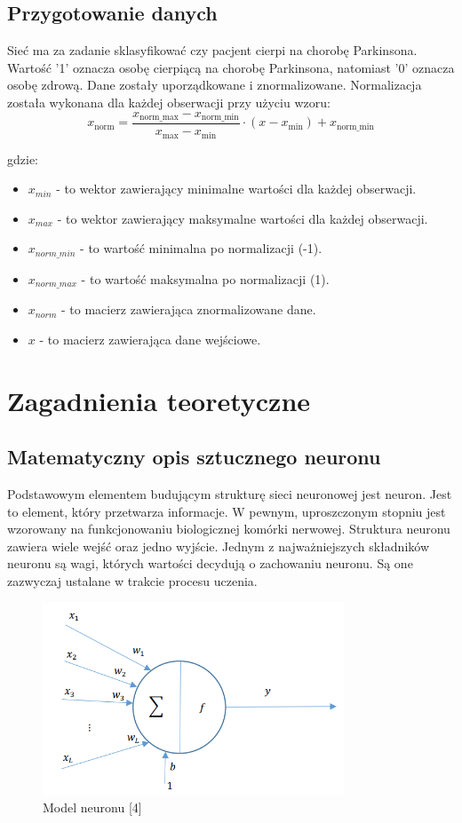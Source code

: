\documentclass{article}
\begin{document}
\subsection{Przygotowanie danych}
Sieć ma za zadanie sklasyfikować czy pacjent cierpi na chorobę Parkinsona. Wartość '1' oznacza osobę cierpiącą na chorobę Parkinsona, natomiast '0' oznacza osobę zdrową.
Dane zostały uporządkowane i znormalizowane.
Normalizacja została wykonana dla każdej obserwacji przy użyciu wzoru:
\[
    x_{\text{norm}} = \frac{{x_{\text{norm\_max}} - x_{\text{norm\_min}}}}{{x_{\text{max}} - x_{\text{min}}}} \cdot (x - x_{\text{min}}) + x_{\text{norm\_min}}
\]

gdzie:
\begin{itemize}
    \item $x_{min}$ - to wektor zawierający minimalne wartości dla każdej obserwacji.
    \item $x_{max}$ - to wektor zawierający maksymalne wartości dla każdej obserwacji.
    \item $x_{norm\_min}$ - to wartość minimalna po normalizacji (-1).
    \item $x_{norm\_max}$ - to wartość maksymalna po normalizacji (1).
    \item $x_{norm}$ - to macierz zawierająca znormalizowane dane.
    \item $x$ - to macierz zawierająca dane wejściowe.
\end{itemize}
\section{Zagadnienia teoretyczne}
\subsection{Matematyczny opis sztucznego neuronu}
Podstawowym elementem budującym strukturę sieci neuronowej jest neuron. Jest to element, który przetwarza informacje.
W pewnym, uproszczonym stopniu jest wzorowany na funkcjonowaniu biologicznej komórki nerwowej.
Struktura neuronu zawiera wiele wejść oraz jedno wyjście.
Jednym z najważniejszych składników neuronu są wagi, których wartości decydują o zachowaniu neuronu. Są one zazwyczaj ustalane w trakcie procesu uczenia.

\begin{figure}[H]
    \centering
    \includegraphics[width=0.8\textwidth, keepaspectratio]{model_neuronu.png}
    \caption{Model neuronu [4]}
    \label{fig:zdjecie}
\end{figure}
\end{document}
